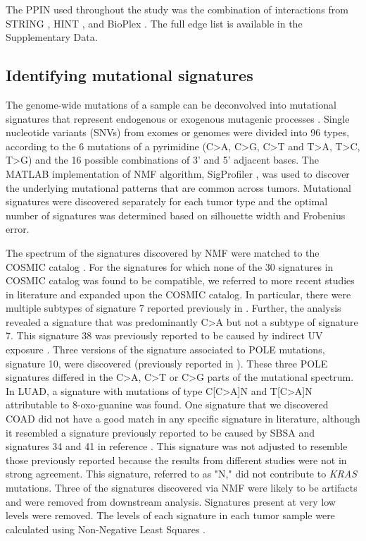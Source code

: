 \documentclass[english, 10pt, letterpaper]{article}
\newcommand{\KRAS}{\emph{KRAS}}
\begin{document}
The PPIN used throughout the study was the combination of interactions from STRING \cite{VonMering2005, Szklarczyk2019}, HINT \cite{Das2012}, and BioPlex \cite{Huttlin2015}.
The full edge list is available in the Supplementary Data.


\subsection*{Identifying mutational signatures}

The genome-wide mutations of a sample can be deconvolved into mutational signatures that represent endogenous or exogenous mutagenic processes \cite{Alexandrov2013}. 
Single nucleotide variants (SNVs) from exomes or genomes were divided into 96 types, according to the 6 mutations of a pyrimidine (C>A, C>G, C>T and T>A, T>C, T>G) and the 16 possible combinations of 3’ and 5’ adjacent bases.
The MATLAB \cite{MATLAB:2010} implementation of NMF algorithm, SigProfiler \cite{Alexandrov2013}, was used to discover the underlying mutational patterns that are common across tumors. 
Mutational signatures were discovered separately for each tumor type and the optimal number of signatures was determined based on silhouette width and Frobenius error. 

The spectrum of the signatures discovered by NMF were matched to the COSMIC catalog \cite{Tate2019}.
For the signatures for which none of the 30 signatures in COSMIC catalog was found to be compatible, we referred to more recent studies in literature and expanded upon the COSMIC catalog. 
In particular, there were multiple subtypes of signature 7 reported previously in \cite{Hayward2017Whole-genomeSubtypes., Alexandrov2020TheCancer.}.
Further, the analysis revealed a signature that was predominantly C>A but not a subtype of signature 7.
This signature 38 was previously reported to be caused by indirect UV exposure \cite{Alexandrov2020TheCancer.}. 
Three versions of the signature associated to POLE mutations, signature 10, were discovered (previously reported in \cite{Alexandrov2020TheCancer.}).
These three POLE signatures differed in the C>A, C>T or C>G parts of the mutational spectrum. 
In LUAD, a signature with mutations of type C[C>A]N and T[C>A]N attributable to 8-oxo-guanine \cite{Alexandrov2020TheCancer.} was found. 
One signature that we discovered COAD did not have a good match in any specific signature in literature, although it resembled a signature previously reported to be caused by SBSA \cite{Lee-Six2019} and signatures 34 and 41 in reference \cite{Alexandrov2020TheCancer.}. 
This signature was not adjusted to resemble those previously reported because the results from different studies were not in strong agreement.
This signature, referred to as "N," did not contribute to \KRAS{} mutations.
Three of the signatures discovered via NMF were likely to be artifacts \cite{Costello2013DiscoveryPreparation.} and were removed from downstream analysis. 
Signatures present at very low levels were removed. 
The levels of each signature in each tumor sample were calculated using Non-Negative Least Squares \cite{Gulhan2019DetectingSamples.}.
\end{document}
